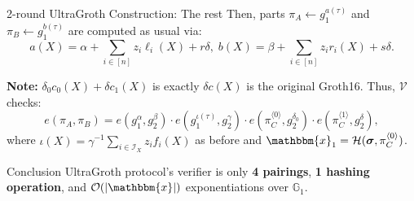 \documentclass{zkdl-presentation-template}
\begin{document}
    \begin{frame}{2-round UltraGroth Construction: The rest}
        Then, parts $\pi_A \gets g_1^{a(\tau)}$ and $\pi_B \gets g_1^{b(\tau)}$ are computed as usual via:
        \begin{equation*}
            a(X) = \alpha + \sum_{i \in [n]}z_i\ell_i(X) + r\delta, \; b(X) = \beta + \sum_{i \in [n]}z_ir_i(X) + s\delta.
        \end{equation*}

        \pause\textbf{Note:} $\delta_0c_0(X) + \delta c_1(X)$ is exactly $\delta c(X)$ is the original Groth16. \pause
        Thus, $\mathcal{V}$ checks:
        \begin{equation*}
            e(\pi_A,\pi_B) = e(g_1^{\alpha},g_2^{\beta}) \cdot e(g_1^{\iota(\tau)},g_2^{\gamma}) \cdot e(\pi_C^{\langle 0 \rangle}, g_2^{\delta_0}) \cdot e(\pi_C^{\langle 1 \rangle}, g_2^{\delta}),
        \end{equation*}
        where $\iota(X) = \gamma^{-1}\sum_{i \in \mathcal{I}_X}z_if_i(X)$ as before
        and $\mathbbm{x}_1 = \mathcal{H}(\boldsymbol{\sigma}, \pi_C^{\langle 0
        \rangle})$.

        \pause\begin{alertblock}{Conclusion}
            UltraGroth protocol's verifier is only \textbf{4 pairings},
            \textbf{1 hashing operation}, and $\mathcal{O}(|\mathbbm{x}|)$
            exponentiations over $\mathbb{G}_1$.
        \end{alertblock}
    \end{frame}
\end{document}
